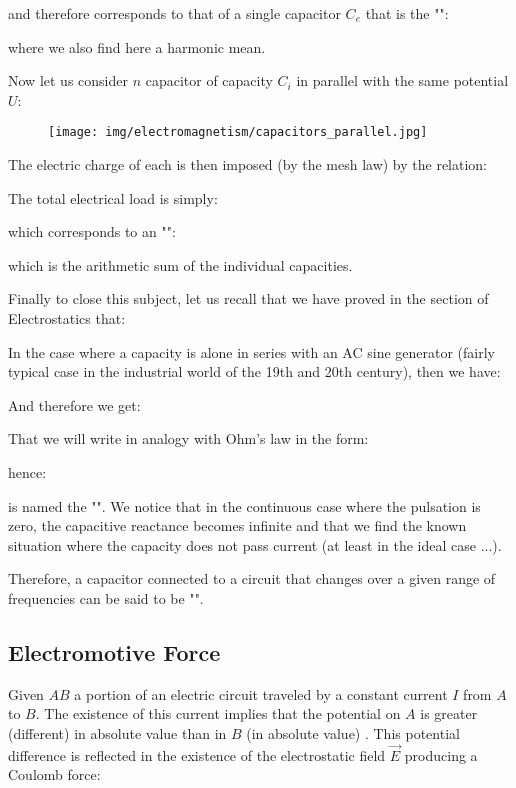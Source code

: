 	and therefore corresponds to that of a single capacitor $C_e$ that is the "":
	
	where we also find here a harmonic mean.
	
	Now let us consider $n$ capacitor of  capacity $C_i$ in parallel with the same potential $U$:
	\begin{figure}[H]
		\centering
		\texttt{[image: img/electromagnetism/capacitors\_parallel.jpg]}
	\end{figure}	
	The electric charge of each is then imposed (by the mesh law) by the relation:
	
	The total electrical load is simply:
	
	which corresponds to an "":
	
	which is the arithmetic sum of the individual capacities.

	Finally to close this subject, let us recall that we have proved in the section of Electrostatics that:
	
	In the case where a capacity is alone in series with an AC sine generator (fairly typical case in the industrial world of the 19th and 20th century), then we have:
	
	And therefore we get:
	
	That we will write in analogy with Ohm's law in the form:
	
	hence:
		
	is named the "". We notice that in the continuous case where the pulsation is zero, the capacitive reactance becomes infinite and that we find the known situation where the capacity does not pass current (at least in the ideal case ...).
	
	Therefore, a capacitor connected to a circuit that changes over a given range of frequencies can be said to be "".
	
	\pagebreak
	\subsection{Electromotive Force}
	Given $AB$ a portion of an electric circuit traveled by a constant current $I$ from $A$ to $B$. The existence of this current implies that the potential on $A$ is greater (different) in absolute value than in $B$ (in absolute value) . This potential difference is reflected in the existence of the electrostatic field $\vec{E}$ producing a Coulomb force:
	
